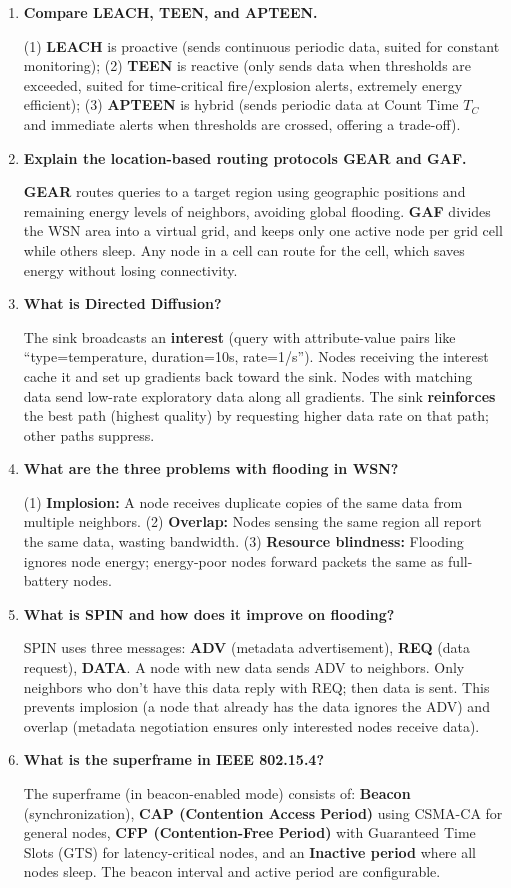 \documentclass[12pt,a4paper]{article}
\newcommand{\Q}[1]{\textbf{#1}\par\noindent\ignorespaces}
\begin{document}
\begin{tcolorbox}[exambox, title={\textbf{Frequently Asked / Viva Questions}}]
\begin{enumerate}[topsep=0pt, label=\textbf{Q\arabic*.}, itemsep=5pt]
  \item \Q{Compare LEACH, TEEN, and APTEEN.}
  (1) \textbf{LEACH} is proactive (sends continuous periodic data, suited for constant monitoring); (2) \textbf{TEEN} is reactive (only sends data when thresholds are exceeded, suited for time-critical fire/explosion alerts, extremely energy efficient); (3) \textbf{APTEEN} is hybrid (sends periodic data at Count Time $T_C$ and immediate alerts when thresholds are crossed, offering a trade-off).

  \item \Q{Explain the location-based routing protocols GEAR and GAF.}
  \textbf{GEAR} routes queries to a target region using geographic positions and remaining energy levels of neighbors, avoiding global flooding. \textbf{GAF} divides the WSN area into a virtual grid, and keeps only one active node per grid cell while others sleep. Any node in a cell can route for the cell, which saves energy without losing connectivity.

  \item \Q{What is Directed Diffusion?}
  The sink broadcasts an \textbf{interest} (query with attribute-value pairs like ``type=temperature, duration=10s, rate=1/s''). Nodes receiving the interest cache it and set up gradients back toward the sink. Nodes with matching data send low-rate exploratory data along all gradients. The sink \textbf{reinforces} the best path (highest quality) by requesting higher data rate on that path; other paths suppress.

  \item \Q{What are the three problems with flooding in WSN?}
  (1) \textbf{Implosion:} A node receives duplicate copies of the same data from multiple neighbors. (2) \textbf{Overlap:} Nodes sensing the same region all report the same data, wasting bandwidth. (3) \textbf{Resource blindness:} Flooding ignores node energy; energy-poor nodes forward packets the same as full-battery nodes.

  \item \Q{What is SPIN and how does it improve on flooding?}
  SPIN uses three messages: \textbf{ADV} (metadata advertisement), \textbf{REQ} (data request), \textbf{DATA}. A node with new data sends ADV to neighbors. Only neighbors who don't have this data reply with REQ; then data is sent. This prevents implosion (a node that already has the data ignores the ADV) and overlap (metadata negotiation ensures only interested nodes receive data).

  \item \Q{What is the superframe in IEEE 802.15.4?}
  The superframe (in beacon-enabled mode) consists of: \textbf{Beacon} (synchronization), \textbf{CAP (Contention Access Period)} using CSMA-CA for general nodes, \textbf{CFP (Contention-Free Period)} with Guaranteed Time Slots (GTS) for latency-critical nodes, and an \textbf{Inactive period} where all nodes sleep. The beacon interval and active period are configurable.
\end{enumerate}
\end{tcolorbox}
\end{document}
